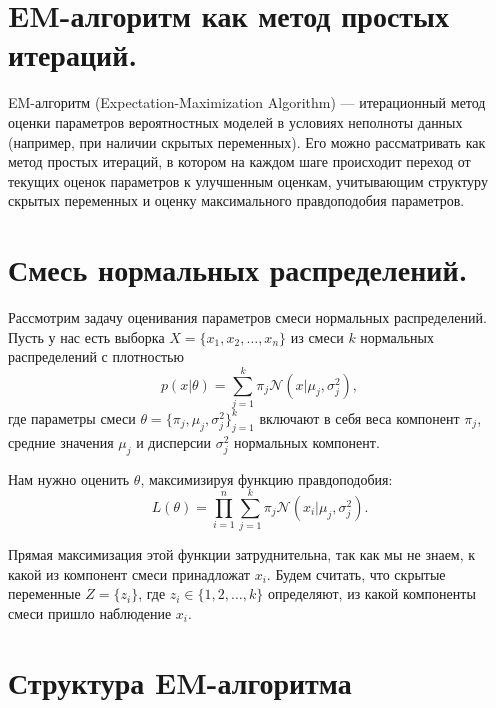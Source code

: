 \section*{\textbf{EM-алгоритм как метод простых итераций.}}

EM-алгоритм (Expectation-Maximization Algorithm) --- итерационный метод оценки параметров вероятностных моделей в условиях неполноты данных (например, при наличии скрытых переменных).  
Его можно рассматривать как метод простых итераций, в котором на каждом шаге происходит переход от текущих оценок параметров к улучшенным оценкам, учитывающим структуру скрытых переменных и оценку максимального правдоподобия параметров.

\section*{\textbf{Смесь нормальных распределений.}}

\noindent Рассмотрим задачу оценивания параметров смеси нормальных распределений. Пусть у нас есть выборка $X = \{x_1, x_2, \dots, x_n\}$ из смеси $k$ нормальных распределений с плотностью
\[
p(x|\theta) = \sum_{j=1}^k \pi_j \mathcal{N}(x|\mu_j, \sigma_j^2),
\]
где параметры смеси $\theta = \{\pi_j, \mu_j, \sigma_j^2 \}_{j=1}^k$ включают в себя веса компонент $\pi_j$, средние значения $\mu_j$ и дисперсии $\sigma_j^2$ нормальных компонент.

\noindent Нам нужно оценить $\theta$, максимизируя функцию правдоподобия:
\[
L(\theta) = \prod_{i=1}^n \sum_{j=1}^k \pi_j \mathcal{N}(x_i|\mu_j, \sigma_j^2).
\]

Прямая максимизация этой функции затруднительна, так как мы не знаем, к какой из компонент смеси принадложат $x_i$. Будем считать, что скрытые переменные $Z = \{z_{i}\}$, где $z_i \in \{1,2,\dots,k\}$ определяют, из какой компоненты смеси пришло наблюдение $x_i$.

\section*{\textbf{Структура EM-алгоритма}}

